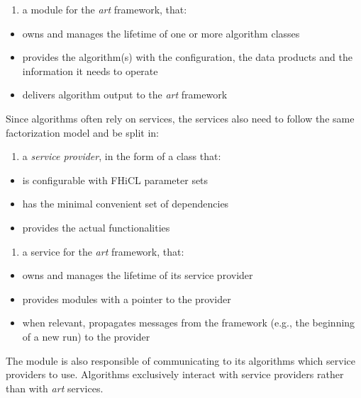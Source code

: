 \begin{enumerate}
\def\labelenumi{\arabic{enumi}.}
\setcounter{enumi}{1}
\item
  a module for the \emph{art} framework, that:
\end{enumerate}

\begin{itemize}
\item
  owns and manages the lifetime of one or more algorithm classes
\item
  provides the algorithm(s) with the configuration, the data products
  and the information it needs to operate
\item
  delivers algorithm output to the \emph{art} framework
\end{itemize}

Since algorithms often rely on services, the services also need to
follow the same factorization model and be split in:

\begin{enumerate}
\def\labelenumi{\arabic{enumi}.}
\item
  a \emph{service provider}, in the form of a class that:
\end{enumerate}

\begin{itemize}
\item
  is configurable with FHiCL parameter sets
\item
  has the minimal convenient set of dependencies
\item
  provides the actual functionalities
\end{itemize}

\begin{enumerate}
\def\labelenumi{\arabic{enumi}.}
\setcounter{enumi}{1}
\item
  a service for the \emph{art} framework, that:
\end{enumerate}

\begin{itemize}
\item
  owns and manages the lifetime of its service provider
\item
  provides modules with a pointer to the provider
\item
  when relevant, propagates messages from the framework (e.g., the
  beginning of a new run) to the provider
\end{itemize}

The module is also responsible of communicating to its algorithms which
service providers to use. Algorithms exclusively interact with service
providers rather than with \emph{art} services.

